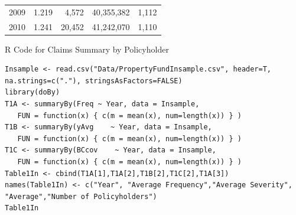 \documentclass[]{book}
\theoremstyle{definition}
\theoremstyle{definition}
\theoremstyle{definition}
\theoremstyle{remark}
\begin{document}
\begin{longtable}[]{@{}lrrrr@{}}
\begin{minipage}[t]{0.17\columnwidth}
2009\strut
\end{minipage} & \begin{minipage}[t]{0.14\columnwidth}\raggedleft\strut
1.219\strut
\end{minipage} & \begin{minipage}[t]{0.17\columnwidth}\raggedleft\strut
4,572\strut
\end{minipage} & \begin{minipage}[t]{0.16\columnwidth}\raggedleft\strut
40,355,382\strut
\end{minipage} & \begin{minipage}[t]{0.16\columnwidth}\raggedleft\strut
1,112\strut
\end{minipage}\tabularnewline
\begin{minipage}[t]{0.17\columnwidth}\raggedright\strut
2010\strut
\end{minipage} & \begin{minipage}[t]{0.14\columnwidth}\raggedleft\strut
1.241\strut
\end{minipage} & \begin{minipage}[t]{0.17\columnwidth}\raggedleft\strut
20,452\strut
\end{minipage} & \begin{minipage}[t]{0.16\columnwidth}\raggedleft\strut
41,242,070\strut
\end{minipage} & \begin{minipage}[t]{0.16\columnwidth}\raggedleft\strut
1,110\strut
\end{minipage}\tabularnewline
\bottomrule
\end{longtable}

R Code for Claims Summary by Policyholder

\hypertarget{display.CoverageBC.2}{}
\begin{verbatim}
Insample <- read.csv("Data/PropertyFundInsample.csv", header=T, na.strings=c("."), stringsAsFactors=FALSE)
library(doBy)
T1A <- summaryBy(Freq ~ Year, data = Insample, 
   FUN = function(x) { c(m = mean(x), num=length(x)) } )
T1B <- summaryBy(yAvg    ~ Year, data = Insample,   
   FUN = function(x) { c(m = mean(x), num=length(x)) } )
T1C <- summaryBy(BCcov    ~ Year, data = Insample,   
   FUN = function(x) { c(m = mean(x), num=length(x)) } )
Table1In <- cbind(T1A[1],T1A[2],T1B[2],T1C[2],T1A[3])
names(Table1In) <- c("Year", "Average Frequency","Average Severity", "Average","Number of Policyholders")
Table1In
\end{verbatim}
\end{document}
